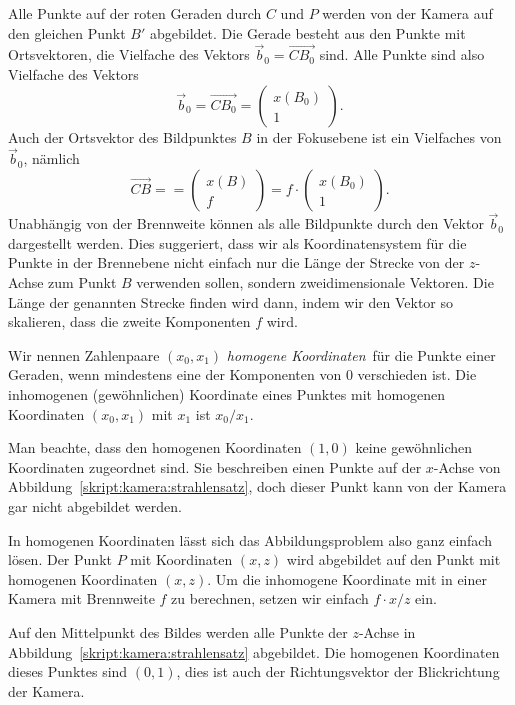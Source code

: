 Alle Punkte auf der roten Geraden durch $C$ und $P$ werden von der Kamera
auf den gleichen Punkt $B'$ abgebildet.
Die Gerade besteht aus den Punkte mit Ortsvektoren, die Vielfache des
Vektors $\vec{b}_0=\overrightarrow{CB_0}$ sind.
Alle Punkte sind also Vielfache des Vektors 
\[
\vec{b}_0
=
\overrightarrow{CB_0}
=
\begin{pmatrix}x(B_0)\\1\end{pmatrix}.
\]
Auch der Ortsvektor des Bildpunktes $B$ in der Fokusebene ist ein Vielfaches 
von $\vec{b}_0$, nämlich
\[
\overrightarrow{CB} =
=
\begin{pmatrix}x(B)\\f\end{pmatrix}
=
f \cdot
\begin{pmatrix}x(B_0)\\1\end{pmatrix}.
\]
Unabhängig von der Brennweite können als alle Bildpunkte durch 
den Vektor $\vec{b}_0$ dargestellt werden.
Dies suggeriert, dass wir als Koordinatensystem für die Punkte in der
Brennebene nicht einfach nur die Länge der Strecke von der $z$-Achse 
zum Punkt $B$ verwenden sollen, sondern zweidimensionale Vektoren.
Die Länge der genannten Strecke finden wird dann, indem wir den Vektor
so skalieren, dass die zweite Komponenten $f$ wird.

\begin{definition}
Wir nennen Zahlenpaare $(x_0,x_1)$ {\em homogene Koordinaten} für die
Punkte einer Geraden, wenn mindestens eine der Komponenten von $0$
verschieden ist.
Die inhomogenen (gewöhnlichen) Koordinate eines Punktes mit
homogenen Koordinaten $(x_0,x_1)$ mit $x_1$ ist $x_0/x_1$.
\end{definition}
%
Man beachte, dass den homogenen Koordinaten $(1,0)$ keine gewöhnlichen
Koordinaten zugeordnet sind.
Sie beschreiben einen Punkte auf der $x$-Achse von
Abbildung~\ref{skript:kamera:strahlensatz}, doch dieser Punkt kann
von der Kamera gar nicht abgebildet werden.

In homogenen Koordinaten lässt sich das Abbildungsproblem also ganz
einfach lösen. 
Der Punkt $P$ mit Koordinaten $(x,z)$ wird abgebildet auf den Punkt
mit homogenen Koordinaten $(x,z)$.
Um die inhomogene Koordinate mit in einer Kamera mit Brennweite $f$ zu
berechnen, setzen wir einfach $f\cdot x/z$ ein.

Auf den Mittelpunkt des Bildes werden alle Punkte der $z$-Achse
in Abbildung~\ref{skript:kamera:strahlensatz} abgebildet.
Die homogenen Koordinaten dieses Punktes sind $(0,1)$, dies ist
auch der Richtungsvektor der Blickrichtung der Kamera.

